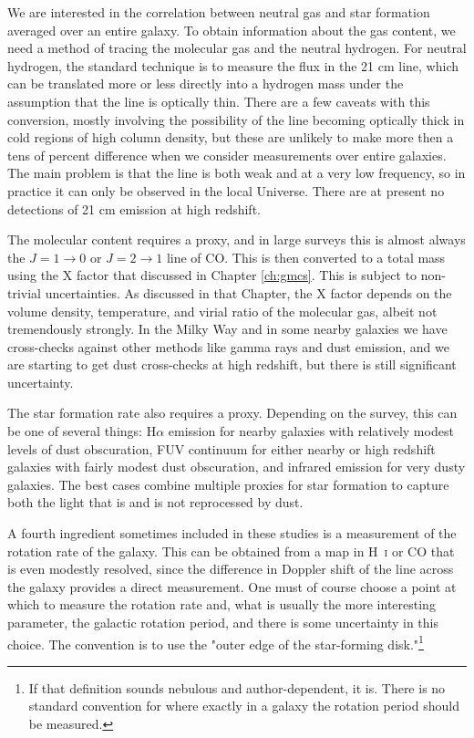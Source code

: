 We are interested in the correlation between neutral gas and star formation averaged over an entire galaxy. To obtain information about the gas content, we need a method of tracing the molecular gas and the neutral hydrogen. For neutral hydrogen, the standard technique is to measure the flux in the 21 cm line, which can be translated more or less directly into a hydrogen mass under the assumption that the line is optically thin. There are a few caveats with this conversion, mostly involving the possibility of the line becoming optically thick in cold regions of high column density, but these are unlikely to make more then a tens of percent difference when we consider measurements over entire galaxies. The main problem is that the line is both weak and at a very low frequency, so in practice it can only be observed in the local Universe. There are at present no detections of 21 cm emission at high redshift.

The molecular content requires a proxy, and in large surveys this is almost always the $J=1\rightarrow 0$ or $J=2\rightarrow 1$ line of CO. This is then converted to a total mass using the X factor that discussed in Chapter \ref{ch:gmcs}. This is subject to non-trivial uncertainties. As discussed in that Chapter, the X factor depends on the volume density, temperature, and virial ratio of the molecular gas, albeit not tremendously strongly. In the Milky Way and in some nearby galaxies we have cross-checks against other methods like gamma rays and dust emission, and we are starting to get dust cross-checks at high redshift, but there is still significant uncertainty.

The star formation rate also requires a proxy. Depending on the survey, this can be one of several things: H$\alpha$ emission for nearby galaxies with relatively modest levels of dust obscuration, FUV continuum for either nearby or high redshift galaxies with fairly modest dust obscuration, and infrared emission for very dusty galaxies. The best cases combine multiple proxies for star formation to capture both the light that is and is not reprocessed by dust.

A fourth ingredient sometimes included in these studies is a measurement of the rotation rate of the galaxy. This can be obtained from a map in H~\textsc{i} or CO that is even modestly resolved, since the difference in Doppler shift of the line across the galaxy provides a direct measurement. One must of course choose a point at which to measure the rotation rate and, what is usually the more interesting parameter, the galactic rotation period, and there is some uncertainty in this choice. The convention is to use the "outer edge of the star-forming disk."\footnote{If that definition sounds nebulous and author-dependent, it is. There is no standard convention for where exactly in a galaxy the rotation period should be measured.}

